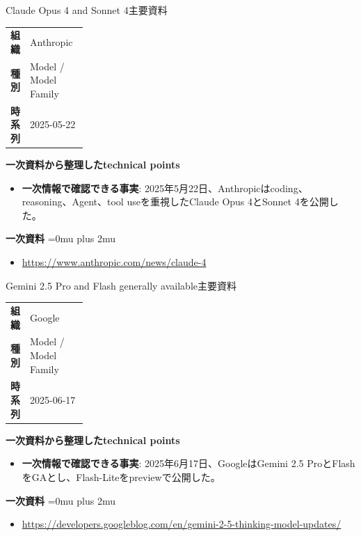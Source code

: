 \begin{technicalnote}{Claude Opus 4 and Sonnet 4}{主要資料}
\begingroup
\begin{tabularx}{\linewidth}{@{}>{\bfseries}p{0.22\linewidth}X@{}}
組織 & Anthropic \\
種別 & Model / Model Family \\
時系列 & 2025-05-22 \\
\end{tabularx}
\smallskip
{\bfseries 一次資料から整理したtechnical points}
\begin{itemize}[leftmargin=1.5em,itemsep=0.35em]
\item \textbf{一次情報で確認できる事実}: 2025年5月22日、Anthropicはcoding、reasoning、Agent、tool useを重視したClaude Opus 4とSonnet 4を公開した。
\end{itemize}
\begin{samepage}
{\bfseries 一次資料}
\begingroup\sloppy
\Urlmuskip=0mu plus 2mu\relax
\begin{itemize}[leftmargin=1.5em,itemsep=0.25em]
\item {\scriptsize\url{https://www.anthropic.com/news/claude-4}}
\end{itemize}
\endgroup
\end{samepage}
\endgroup
\end{technicalnote}
\medskip

\begin{technicalnote}{Gemini 2.5 Pro and Flash generally available}{主要資料}
\begingroup
\begin{tabularx}{\linewidth}{@{}>{\bfseries}p{0.22\linewidth}X@{}}
組織 & Google \\
種別 & Model / Model Family \\
時系列 & 2025-06-17 \\
\end{tabularx}
\smallskip
{\bfseries 一次資料から整理したtechnical points}
\begin{itemize}[leftmargin=1.5em,itemsep=0.35em]
\item \textbf{一次情報で確認できる事実}: 2025年6月17日、GoogleはGemini 2.5 ProとFlashをGAとし、Flash-Liteをpreviewで公開した。
\end{itemize}
\begin{samepage}
{\bfseries 一次資料}
\begingroup\sloppy
\Urlmuskip=0mu plus 2mu\relax
\begin{itemize}[leftmargin=1.5em,itemsep=0.25em]
\item {\scriptsize\url{https://developers.googleblog.com/en/gemini-2-5-thinking-model-updates/}}
\end{itemize}
\endgroup
\end{samepage}
\endgroup
\end{technicalnote}
\medskip
